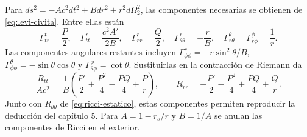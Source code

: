 \label{sec:anexo-geometria}
Para $ds^2=-Ac^2dt^2+Bdr^2+r^2d\Omega_2^2$, las componentes necesarias
se obtienen de \eqref{eq:levi-civita}. Entre ellas están
\[
\Gamma^t_{tr}=\frac P2,\quad
\Gamma^r_{tt}=\frac{c^2A'}{2B},\quad
\Gamma^r_{rr}=\frac Q2,\quad
\Gamma^r_{\theta\theta}=-\frac rB,\quad
\Gamma^\theta_{r\theta}=\Gamma^\phi_{r\phi}=\frac1r.
\]
Las componentes angulares restantes incluyen
$\Gamma^r_{\phi\phi}=-r\sin^2\theta/B$,
$\Gamma^\theta_{\phi\phi}=-\sin\theta\cos\theta$ y
$\Gamma^\phi_{\theta\phi}=\cot\theta$.
Sustituirlas en la contracción de Riemann da
\[
\frac{R_{tt}}{Ac^2}=\frac1B
 \left(\frac{P'}2+\frac{P^2}4-\frac{PQ}4+\frac Pr\right),\qquad
R_{rr}=-\frac{P'}2-\frac{P^2}4+\frac{PQ}4+\frac Qr.
\]
Junto con $R_{\theta\theta}$ de \eqref{eq:ricci-estatico}, estas
componentes permiten reproducir la deducción del capítulo 5. Para
$A=1-r_s/r$ y $B=1/A$ se anulan las componentes de Ricci en el exterior.
